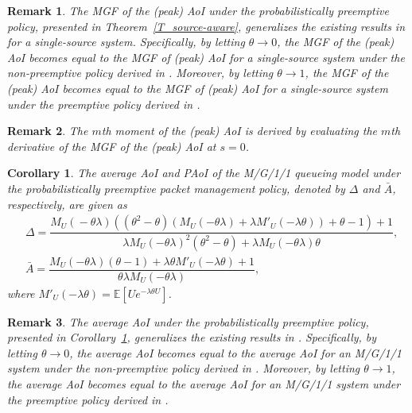 \documentclass[conference]{IEEEtran}
\newtheorem{corollary}{Corollary}
\newtheorem{rem}{Remark}
\def\blue{\textcolor{blue}}
\begin{document}
\begin{rem}
The MGF of the (peak) AoI under the probabilistically preemptive policy, presented in Theorem~\ref{T_source-aware}, generalizes the existing results in \cite{9869867} for a single-source system. Specifically, by letting $\theta\rightarrow 0$, the MGF of the (peak) AoI becomes equal to the MGF of (peak) AoI for a single-source system under the non-preemptive policy derived in \cite{9869867}.   Moreover, by letting $\theta\rightarrow 1$, the MGF of the (peak) AoI becomes equal to the MGF of (peak) AoI for a single-source system under the preemptive policy derived in \cite{9869867}.
\end{rem}



\begin{rem}\label{rem1MGFage}
The $m$th moment of the (peak) AoI is derived by evaluating the $m$th derivative of the MGF of the (peak) AoI at $s=0$. 
\end{rem}


\begin{corollary}\label{agemg11theoremblock}
The average AoI and  PAoI of the M/G/1/1 queueing model under the probabilistically preemptive packet management  policy, denoted by $\Delta$ and $\bar{A}$, respectively, are given as
\begin{align}
&\Delta\!=\!\dfrac{\!M_{U}(\!-\theta\lambda)((\theta^2\!-\!\theta)(M_{U}(-\theta\lambda)\!+\!\!\lambda M'_{U} (-\lambda\theta))\!+\!\theta\!-\!1)\!+\!1}{\lambda M_{U}(-\theta\lambda)^2(\theta^2-\theta)+\lambda M_{U}(-\theta\lambda) \theta},
\\&
\bar{A}=\dfrac{M_{U}(-\theta\lambda)(\theta-1)+\lambda\theta M'_{U} (-\lambda\theta)+1}{\theta\lambda M_{U}(-\theta\lambda)},
\end{align}
where $M'_{U} (-\lambda\theta)=\mathbb{E}[Ue^{-\lambda\theta U}]$. 
%
\end{corollary}



\begin{rem}
The average AoI under the probabilistically preemptive policy, presented in Corollary~\ref{agemg11theoremblock}, generalizes the existing results in \cite{8006504}. Specifically, by letting $\theta\rightarrow 0$, the average AoI becomes equal to the average AoI for an M/G/1/1 system under the non-preemptive policy derived in \cite[Theorem~1]{8006504}. Moreover, by letting $\theta\rightarrow 1$, the average AoI becomes equal to the average AoI for an M/G/1/1 system under the preemptive policy derived in \cite[Theorem~5]{8006504}.
\end{rem}
\end{document}
